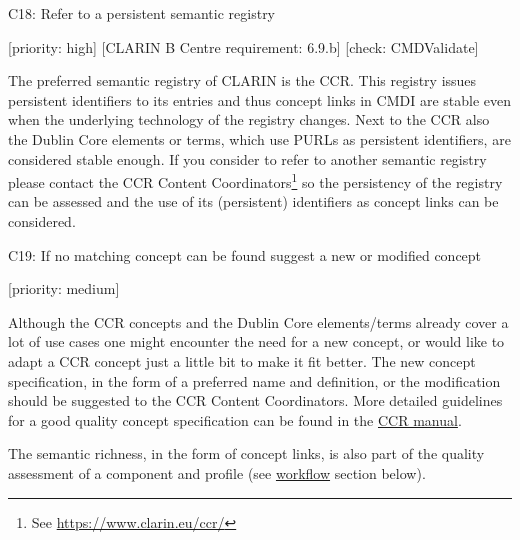 \documentclass[]{article}
\begin{document}
C18: Refer to a persistent semantic registry

{[}priority: high{]} {[}CLARIN B Centre requirement: 6.9.b{]} {[}check:
CMDValidate{]}

The preferred semantic registry of CLARIN is the CCR. This registry
issues persistent identifiers to its entries and thus concept links in
CMDI are stable even when the underlying technology of the registry
changes. Next to the CCR also the Dublin Core elements or terms, which
use PURLs as persistent identifiers, are considered stable enough. If
you consider to refer to another semantic registry please contact the
CCR Content Coordinators\footnote{See \url{https://www.clarin.eu/ccr/}}
so the persistency of the registry can be assessed and the use of its
(persistent) identifiers as concept links can be considered.

C19: If no matching concept can be found suggest a new or modified
concept

{[}priority: medium{]}

Although the CCR concepts and the Dublin Core elements/terms already
cover a lot of use cases one might encounter the need for a new concept,
or would like to adapt a CCR concept just a little bit to make it fit
better. The new concept specification, in the form of a preferred name
and definition, or the modification should be suggested to the CCR
Content Coordinators. More detailed guidelines for a good quality
concept specification can be found in the
\href{https://www.overleaf.com/read/pxnsftbcphhb}{CCR manual}.

The semantic richness, in the form of concept links, is also part of the
quality assessment of a component and profile (see
\href{/modelling_component_metadata/workflow.md}{workflow} section
below).
\end{document}
